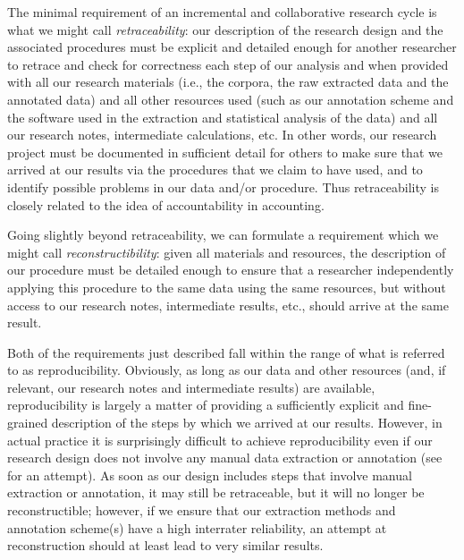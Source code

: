 The minimal requirement of an incremental and collaborative research cycle is what we might call \textit{retraceability}:  our description of the research design  and the associated procedures must be explicit and detailed enough for another researcher to retrace and check for correctness each step of our analysis and when provided with all our research materials (i.e., the corpora, the raw extracted  data and the annotated  data) and all other resources used (such as our annotation scheme and the software used in the extraction and statistical analysis of the data) and all our research notes, intermediate calculations, etc. In other words, our research project must be documented in sufficient detail for others to make sure that we arrived at our results via the procedures that we claim to have used, and to identify possible problems in our data and\slash or procedure. Thus retraceability  is closely related to the idea of accountability in accounting.

Going slightly beyond retraceability,  we can formulate a requirement which we might call \textit{reconstructibility}:  given all materials and resources, the description of our procedure must be detailed enough to ensure that a researcher independently applying this procedure to the same data using the same resources, but without access to our research notes, intermediate results, etc., should arrive at the same result.

Both of the requirements just described fall within the range of what is referred to as reproducibility. Obviously, as long as our data and other resources (and, if relevant, our research notes and intermediate results) are available, reproducibility  is largely a matter of providing a sufficiently explicit and fine\hyp{}grained description of the steps by which we arrived at our results. However, in actual practice it is surprisingly difficult to achieve reproducibility even if our research design  does not involve any manual data extraction or annotation (see \citet{stefanowitsch_goal_2018} for an attempt). As soon as our design includes steps that involve manual  extraction or annotation,  it may still be retraceable,  but it will no longer be reconstructible;  however, if we ensure that our extraction methods and annotation scheme(s) have a high interrater  reliability, an attempt at reconstruction should at least lead to very similar results.

